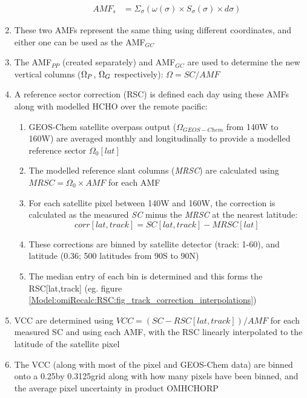 \begin{enumerate}
\begin{enumerate}
\begin{align}
          AMF_s &= \Sigma_{\sigma} \left(\omega(\sigma) \times S_{\sigma}(\sigma) \times d\sigma \right)
        \end{align}
      \end{enumerate}
      \item These two AMFs represent the same thing using different coordinates, and either one can be used as the AMF$_{GC}$
      \item The AMF$_{PP}$ (created separately) and AMF$_{GC}$ are used to determine the new vertical columns ($\Omega_{P}$, $\Omega_{G}$ respectively): $\Omega = SC/AMF$
      \item A reference sector correction (RSC) is defined each day using these AMFs along with modelled HCHO over the remote pacific:
      \begin{enumerate}
        \item GEOS-Chem satellite overpass output ($\Omega_{GEOS-Chem}$ from 140{\degr}W to 160{\degr}W) are averaged monthly and longitudinally to provide a modelled reference sector $\Omega_0[lat]$
        \item The modelled reference slant columns (\textit{MRSC}) are calculated using $MRSC = \Omega_0 \times AMF$ for each AMF
        \item For each satellite pixel between 140{\degr}W and 160{\degr}W, the correction is calculated as the measured \textit{SC} minus the \textit{MRSC} at the nearest latitude:
        \begin{equation*}
          corr[lat,track] = SC[lat,track] - MRSC[lat]
        \end{equation*}
        \item These corrections are binned by satellite detector (track: 1-60), and latitude (0.36\degr; 500 latitudes from 90{\degr}S to 90{\degr}N)
        \item The median entry of each bin is determined and this forms the RSC[lat,track] (eg. figure \ref{Model:omiRecalc:RSC:fig_track_correction_interpolations})
      \end{enumerate}
      \item VCC are determined using $VCC = (SC - RSC[lat,track] )/AMF$ for each measured SC and using each AMF, with the RSC linearly interpolated to the latitude of the satellite pixel
      \item The VCC (along with most of the pixel and GEOS-Chem data) are binned onto a 0.25\degr by 0.3125\degr grid along with how many pixels have been binned, and the average pixel uncertainty in product OMHCHORP
    \end{enumerate}
 
